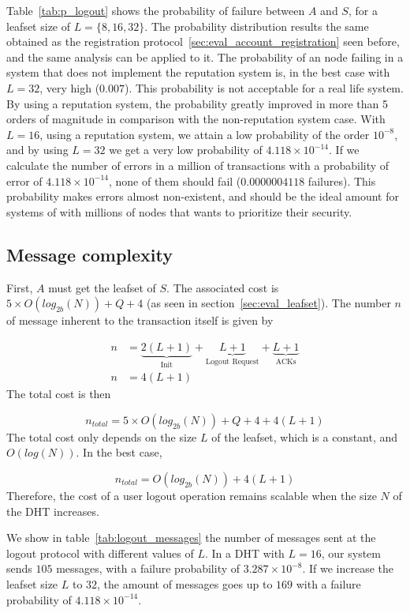     Table~\eqref{tab:p_logout} shows the probability of failure
between $A$ and $S$, for a leafset size of $L = \{8,16,32\}$.
  The probability distribution results the same obtained as the registration
protocol~\ref{sec:eval_account_registration} seen before, and the same analysis
can be applied to it. The probability
of an node failing in a system that does not implement the reputation system
is, in the best case with $L=32$, very high ($0.007$). This probability is not
acceptable for a real life system.  By using a reputation system, the probability greatly
improved in more than 5 orders of magnitude in comparison with the
non-reputation system case. With $L=16$, using a reputation system, we attain
a low probability of the order $10^{-8}$, and by using $L=32$ we get a very low
probability of $4.118 \times 10^{-14}$. If we calculate the number of
errors in a million of transactions with a probability of error of $4.118
\times 10^{-14}$, none of them should fail ($0.0000004118$ failures). This probability
makes errors almost non-existent, and should be the ideal amount for systems of with
millions of nodes that wants to prioritize their security.

    
  \subsection{Message complexity}
    First, $A$ must get the leafset of $S$. The associated cost is $5
\times O(log_{2b}(N)) + Q + 4$ (as seen in section~\ref{sec:eval_leafset}).
    The number $n$ of message inherent to the transaction itself is given by

    \begin{align}
      n &= \underbrace{2(L+1)}_\text{Init} +  \underbrace{L+1}_\text{Logout Request} + \underbrace{L+1}_\text{ACKs}\\
      n &= 4(L+1)
    \end{align}
     The total cost is then

    $$
      n_{total} = 5 \times O(log_{2b}(N)) + Q + 4 + 4(L+1)
    $$    
    The total cost only depends on the size $L$ of the leafset, which is a
constant, and $O(log(N))$. In the best case, 

    $$
      n_{total} = O(log_{2b}(N)) + 4(L+1)
    $$
    Therefore, the cost of a user logout operation remains scalable when the size $N$ of the DHT increases.

    We show in table~\ref{tab:logout_messages} the number of messages sent at
the logout protocol with different values of $L$. In a DHT with
$L = 16$, our system sends $105$ messages, with a failure probability of
 $3.287 \times 10^{-8}$. If we increase the leafset size $L$ to $32$, the amount of
messages goes up to $169$ with a failure probability of $4.118 \times 10^{-14}$.


